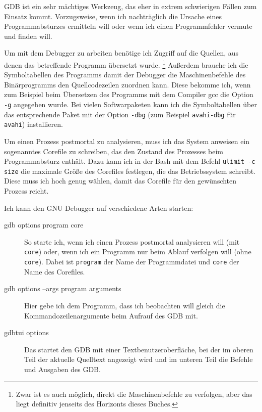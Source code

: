 \begin{normaltext}
  GDB ist ein sehr mächtiges Werkzeug, das eher in extrem schwierigen Fällen
  zum Einsatz kommt. Vorzugsweise, wenn ich nachträglich die Ursache eines
  Programmabsturzes ermitteln will oder wenn ich einen Programmfehler vermute
  und finden will.

  Um mit dem Debugger zu arbeiten benötige ich Zugriff auf die Quellen, aus
  denen das betreffende Programm übersetzt wurde.
  \footnote{Zwar ist es auch möglich, direkt die Maschinenbefehle zu verfolgen,
  aber das liegt definitiv jenseits des Horizonts dieses Buches.}
  Außerdem brauche ich die Symboltabellen des Programms damit der Debugger die
  Maschinenbefehle des Binärprogramms den Quellcodezeilen zuordnen kann. Diese
  bekomme ich, wenn zum Beispiel beim Übersetzen des Programms mit dem
  Compiler gcc die Option \verb?-g? angegeben wurde. Bei vielen Softwarpaketen
  kann ich die Symboltabellen über das entsprechende Paket mit der Option
  \verb?-dbg? (zum Beispiel \verb?avahi-dbg? für \verb?avahi?) installieren.

  Um einen Prozess postmortal zu analysieren, muss ich das System anweisen ein
  sogenanntes Corefile zu schreiben, das den Zustand des Prozesses beim
  Programmabsturz enthält. Dazu kann ich in der Bash mit dem Befehl
  \verb?ulimit -c size? die maximale Größe des Corefiles festlegen, die das
  Betriebssystem schreibt. Diese muss ich hoch genug wählen, damit das
  Corefile für den gewünschten Prozess reicht.

  Ich kann den GNU Debugger auf verschiedene Arten starten:
  \begin{description}
    \item[gdb options program core] So starte ich, wenn ich einen
      Prozess postmortal analysieren will (mit \verb?core?) oder, wenn ich
      ein Programm nur beim Ablauf verfolgen will (ohne \verb?core?). Dabei
      ist \verb?program? der Name der Programmdatei und \verb?core? der Name
      des Corefiles.
    \item[gdb options --args program arguments] Hier gebe ich dem
      Programm, dass ich beobachten will gleich die Kommandozeilenargumente
      beim Aufrauf des GDB mit.
    \item[gdbtui options] Das startet den GDB mit einer
      Textbenutzeroberfläche, bei der im oberen Teil der aktuelle Quelltext
      angezeigt wird und im unteren Teil die Befehle und Ausgaben des GDB.
  \end{description}


\end{normaltext}

